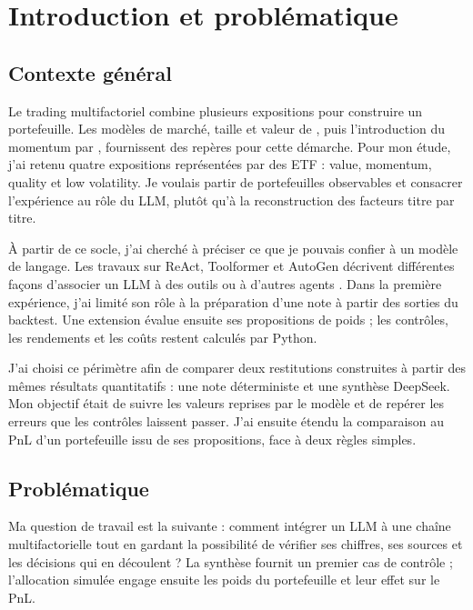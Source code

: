 \chapter{Introduction et problématique}\label{cap:introduction}

\section{Contexte général}

Le trading multifactoriel combine plusieurs expositions pour construire un portefeuille. Les modèles de marché, taille et valeur de \citet{famaFrench1993}, puis l'introduction du momentum par \citet{carhart1997}, fournissent des repères pour cette démarche. Pour mon étude, j'ai retenu quatre expositions représentées par des ETF : value, momentum, quality et low volatility. Je voulais partir de portefeuilles observables et consacrer l'expérience au rôle du LLM, plutôt qu'à la reconstruction des facteurs titre par titre.

À partir de ce socle, j'ai cherché à préciser ce que je pouvais confier à un modèle de langage. Les travaux sur ReAct, Toolformer et AutoGen décrivent différentes façons d'associer un LLM à des outils ou à d'autres agents \citep{yao2023react,schick2023toolformer,wu2023autogen}. Dans la première expérience, j'ai limité son rôle à la préparation d'une note à partir des sorties du backtest. Une extension évalue ensuite ses propositions de poids ; les contrôles, les rendements et les coûts restent calculés par Python.

J'ai choisi ce périmètre afin de comparer deux restitutions construites à partir des mêmes résultats quantitatifs : une note déterministe et une synthèse DeepSeek. Mon objectif était de suivre les valeurs reprises par le modèle et de repérer les erreurs que les contrôles laissent passer. J'ai ensuite étendu la comparaison au PnL d'un portefeuille issu de ses propositions, face à deux règles simples.

\section{Problématique}

Ma question de travail est la suivante : comment intégrer un LLM à une chaîne multifactorielle tout en gardant la possibilité de vérifier ses chiffres, ses sources et les décisions qui en découlent ? La synthèse fournit un premier cas de contrôle ; l'allocation simulée engage ensuite les poids du portefeuille et leur effet sur le PnL.

